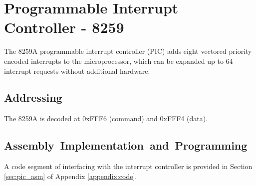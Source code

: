 \section{Programmable Interrupt Controller - 8259}
The 8259A programmable interrupt controller (PIC) adds eight vectored priority encoded interrupts to the microprocessor, which can be expanded up to 64 interrupt requests without additional hardware.

    \subsection{Addressing}
    The 8259A is decoded at 0xFFF6 (command) and 0xFFF4 (data).

    \subsection{Assembly Implementation and Programming}
    A code segment of interfacing with the interrupt controller is provided in Section \ref{sec:pic_asm} of Appendix \ref{appendix:code}.

